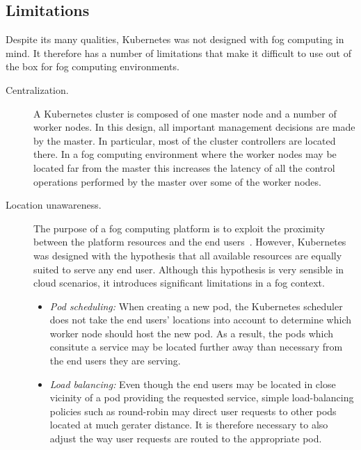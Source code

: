 \documentclass[letterpaper,twocolumn,10pt]{article}
\begin{document}
\subsection{Limitations}

Despite its many qualities, Kubernetes was not designed with fog
computing in mind. It therefore has a number of limitations that make
it difficult to use out of the box for fog computing environments.

\begin{description}
\item[Centralization.] A Kubernetes cluster is composed of one master
  node and a number of worker nodes. In this design, all important
  management decisions are made by the master. In particular, most of
  the cluster controllers are located there. In a fog computing
  environment where the worker nodes may be located far from the
  master this increases the latency of all the control operations
  performed by the master over some of the worker nodes.

\item[Location unawareness.]  The purpose of a fog computing platform
  is to exploit the proximity between the platform resources and the
  end users~\cite{bonomi2014}. However,
  Kubernetes was designed with the hypothesis that all available
  resources are equally suited to serve any end user. Although this
  hypothesis is very sensible in cloud scenarios, it introduces
  significant limitations in a fog context.

  \begin{itemize}[leftmargin=*,itemsep=2pt,topsep=-3pt,labelsep=6pt]
  \item \emph{Pod scheduling:} When creating a new pod, the Kubernetes
    scheduler does not take the end users' locations into account to
    determine which worker node should host the new pod. As a result,
    the pods which consitute a service may be located further away
    than necessary from the end users they are serving.
  \item \emph{Load balancing:} Even though the end users may be
    located in close vicinity of a pod providing the requested
    service, simple load-balancing policies such as round-robin may
    direct user requests to other pods located at much gerater
    distance. It is therefore necessary to also adjust the way user
    requests are routed to the appropriate pod.
  \end{itemize}
\end{description}
\end{document}
